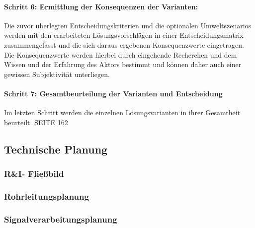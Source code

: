 \paragraph{Schritt 6: Ermittlung der Konsequenzen der Varianten:} Die zuvor überlegten Entscheidungskriterien und die optionalen Umweltszenarios werden mit den erarbeiteten Lösungsvorschlägen in einer Entscheidungsmatrix zusammengefasst und die sich daraus ergebenen Konsequenzwerte eingetragen. Die Konsequenzwerte werden hierbei durch eingehende Recherchen und dem Wissen und der Erfahrung des Aktors bestimmt und können daher auch einer gewissen Subjektivität unterliegen.

\paragraph{Schritt 7: Gesamtbeurteilung der Varianten und Entscheidung} Im letzten Schritt werden die einzelnen Lösungsvarianten in ihrer Gesamtheit beurteilt.  SEITE 162


\subsection{Technische Planung}
\subsubsection{R\&I- Fließbild}

\subsubsection{Rohrleitungsplanung}

\subsubsection{Signalverarbeitungsplanung}


%
%
%
%
%
